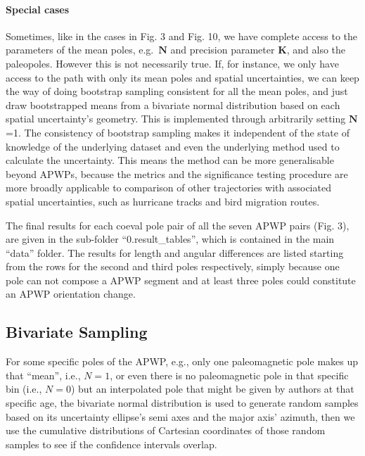 \paragraph{Special cases} Sometimes, like in the cases in Fig. 3 and Fig. 10, we
have complete access to the parameters of the mean poles, e.g.\ $\mathbf{N}$ and
precision parameter $\mathbf{K}$, and also the paleopoles. However this is not
necessarily true. If, for instance, we only have access to the path with only
its mean poles and spatial uncertainties, we can keep the way of doing bootstrap
sampling consistent for all the mean poles, and just draw bootstrapped means
from a bivariate normal distribution based on each spatial uncertainty's
geometry. This is implemented through arbitrarily setting $\mathbf{N}$=1. The
consistency of bootstrap sampling makes it independent of the state of knowledge
of the underlying dataset and even the underlying method used to calculate the
uncertainty. This means the method can be more generalisable beyond APWPs,
because the metrics and the significance testing procedure are more broadly
applicable to comparison of other trajectories with associated spatial
uncertainties, such as hurricane tracks and bird migration routes.

The final results for each coeval pole pair of all the seven APWP pairs (Fig. 3),
are given in the sub-folder ``0.result\_tables'', which is contained in the main
``data'' folder. The results for length and angular differences are listed
starting from the rows for the second and third poles respectively, simply
because one pole can not compose a APWP segment and at least three poles could
constitute an APWP orientation change.

\subsection{Bivariate Sampling}\label{sec:biv}
For some specific poles of the APWP, e.g., only one paleomagnetic pole makes up
that ``mean'', i.e., $N=1$, or even there is no paleomagnetic pole in that
specific bin (i.e., $N=0$) but an interpolated pole that might be given by
authors at that specific age, the bivariate normal distribution is used to
generate random samples based on its uncertainty ellipse's semi axes and the
major axis' azimuth, then we use the cumulative distributions of Cartesian
coordinates of those random samples to see if the confidence intervals overlap.

